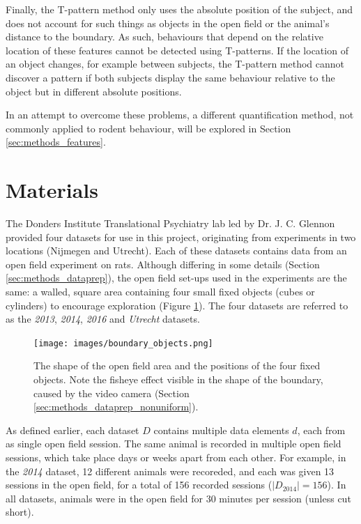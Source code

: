 \documentclass[conference,a4paper,twoside]{IEEEtran}
\begin{document}
Finally, the T-pattern method only uses the absolute position of the subject, and does not account for such things as objects in the open field or the animal's distance to the boundary. As such, behaviours that depend on the relative location of these features cannot be detected using T-patterns. If the location of an object changes, for example between subjects, the T-pattern method cannot discover a pattern if both subjects display the same behaviour relative to the object but in different absolute positions.

In an attempt to overcome these problems, a different quantification method, not commonly applied to rodent behaviour, will be explored in Section \ref{sec:methods_features}.

\section{Materials}
\label{sec:materials}

The Donders Institute Translational Psychiatry lab led by Dr. J. C. Glennon provided four datasets for use in this project, originating from experiments in two locations (Nijmegen and Utrecht). Each of these datasets contains data from an open field experiment on rats. Although differing in some details (Section \ref{sec:methods_dataprep}), the open field set-ups used in the experiments are the same: a walled, square area containing four small fixed objects (cubes or cylinders) to encourage exploration (Figure \ref{fig:boundary_objects}). The four datasets are referred to as the \emph{2013}, \emph{2014}, \emph{2016} and \emph{Utrecht} datasets.

\begin{figure}
    \centering
    \texttt{[image: images/boundary\_objects.png]}
    \caption{The shape of the open field area and the positions of the four fixed objects. Note the fisheye effect visible in the shape of the boundary, caused by the video camera (Section \ref{sec:methods_dataprep_nonuniform}).}
    \label{fig:boundary_objects}
\end{figure}

As defined earlier, each dataset $D$ contains multiple data elements $d$, each from as single open field session. The same animal is recorded in multiple open field sessions, which take place days or weeks apart from each other. For example, in the \emph{2014} dataset, 12 different animals were recoreded, and each was given 13 sessions in the open field, for a total of 156 recorded sessions ($|D_{\text{2014}}| = 156$). In all datasets, animals were in the open field for 30 minutes per session (unless cut short).
\end{document}
